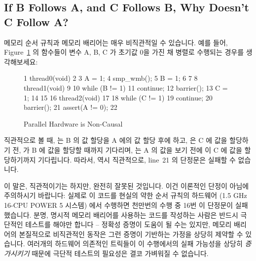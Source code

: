 \subsection{If B Follows A, and C Follows B, Why Doesn't C Follow A?}
\label{sec:advsync:If B Follows A, and C Follows B, Why Doesn't C Follow A?}

메모리 순서 규칙과 메모리 배리어는 매우 비직관적일 수 있습니다.
예를 들어, Figure~\ref{fig:advsync:Parallel Hardware is Non-Causal} 의 함수들이
변수 A, B, C 가 초기값 0을 가진 채 병렬로 수행되는 경우를 생각해보세요:

\begin{figure}[htbp]
{ \scriptsize
\begin{verbbox}
  1 thread0(void)
  2 {
  3   A = 1;
  4   smp_wmb();
  5   B = 1;
  6 }
  7
  8 thread1(void)
  9 {
 10   while (B != 1)
 11     continue;
 12   barrier();
 13   C = 1;
 14 }
 15
 16 thread2(void)
 17 {
 18   while (C != 1)
 19     continue;
 20   barrier();
 21   assert(A != 0);
 22 }
\end{verbbox}
}
\centering
\theverbbox
\caption{Parallel Hardware is Non-Causal}
\label{fig:advsync:Parallel Hardware is Non-Causal}
\end{figure}

직관적으로 볼 때,  는 B 의 값 할당을 A 에의 값 할당 후에 하고,
 은 C 에 값을 할당하기 전,  가 B 에 값을 할당할
때까지 기다리며,  는 A 의 값을 보기 전에  이 C 에
값을 할당하기까지 기다립니다.
따라서, 역시 직관적으로, line~21 의 단정문은 실패할 수 없습니다.

이 말은, 직관적이기는 하지만, 완전히 잘못된 것입니다.
이건 이론적인 단정이 아님에 주의하시기 바랍니다: 실제로 이 코드를 현실의 약한
순서 규칙의 하드웨어 (1.5 GHz 16-CPU POWER 5 시스템) 에서 수행하면 천만번의
수행 중 16번 이 단정문이 실패했습니다.
분명, 명시적 메모리 배리어를 사용하는 코드를 작성하는 사람은 반드시 극단적인
테스트를 해야만 합니다 -- 정확성 증명이 도움이 될 수는 있지만, 메모리 배리어의
본질적으로 비직관적인 동작은 그런 증명이 기반하는 가정을 상당히 제약할 수
있습니다.
여러개의 하드웨어 의존적인 트릭들이 이 수행에서의 실패 가능성을 상당히
\emph{증가시키기} 때문에 극단적 테스트의 필요성은 결코 가벼워질 수 없습니다.
\iffalse


